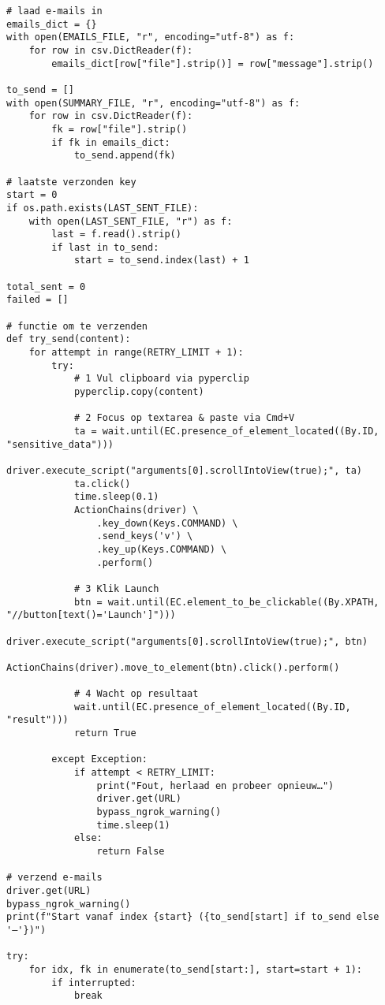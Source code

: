 \begin{lstlisting}[style=custompython,caption={Selenium WebDriver script voor automatisering van gegevensverwerking variabelen},label={lst:send-request}, captionpos=b]
# laad e-mails in
emails_dict = {}
with open(EMAILS_FILE, "r", encoding="utf-8") as f:
    for row in csv.DictReader(f):
        emails_dict[row["file"].strip()] = row["message"].strip()

to_send = []
with open(SUMMARY_FILE, "r", encoding="utf-8") as f:
    for row in csv.DictReader(f):
        fk = row["file"].strip()
        if fk in emails_dict:
            to_send.append(fk)

# laatste verzonden key
start = 0
if os.path.exists(LAST_SENT_FILE):
    with open(LAST_SENT_FILE, "r") as f:
        last = f.read().strip()
        if last in to_send:
            start = to_send.index(last) + 1

total_sent = 0
failed = []

# functie om te verzenden
def try_send(content):
    for attempt in range(RETRY_LIMIT + 1):
        try:
            # 1 Vul clipboard via pyperclip
            pyperclip.copy(content)

            # 2 Focus op textarea & paste via Cmd+V
            ta = wait.until(EC.presence_of_element_located((By.ID, "sensitive_data")))
            driver.execute_script("arguments[0].scrollIntoView(true);", ta)
            ta.click()
            time.sleep(0.1)
            ActionChains(driver) \
                .key_down(Keys.COMMAND) \
                .send_keys('v') \
                .key_up(Keys.COMMAND) \
                .perform()

            # 3 Klik Launch
            btn = wait.until(EC.element_to_be_clickable((By.XPATH, "//button[text()='Launch']")))
            driver.execute_script("arguments[0].scrollIntoView(true);", btn)
            ActionChains(driver).move_to_element(btn).click().perform()

            # 4 Wacht op resultaat
            wait.until(EC.presence_of_element_located((By.ID, "result")))
            return True

        except Exception:
            if attempt < RETRY_LIMIT:
                print("Fout, herlaad en probeer opnieuw…")
                driver.get(URL)
                bypass_ngrok_warning()
                time.sleep(1)
            else:
                return False

# verzend e-mails
driver.get(URL)
bypass_ngrok_warning()
print(f"Start vanaf index {start} ({to_send[start] if to_send else '–'})")

try:
    for idx, fk in enumerate(to_send[start:], start=start + 1):
        if interrupted:
            break


\end{lstlisting}
